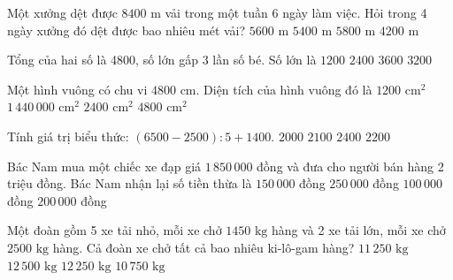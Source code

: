 \begin{ex} %
Một xưởng dệt được $8400\text{ m}$ vải trong một tuần 6 ngày làm việc. Hỏi trong 4 ngày xưởng đó dệt được bao nhiêu mét vải?
\choice
{\True $5600\text{ m}$}
{$5400\text{ m}$}
{$5800\text{ m}$}
{$4200\text{ m}$}
\end{ex}

\begin{ex} %
Tổng của hai số là 4800, số lớn gấp 3 lần số bé. Số lớn là
\choice
{$1200$}
{$2400$}
{\True $3600$}
{$3200$}
\end{ex}

\begin{ex} %
Một hình vuông có chu vi $4800\text{ cm}$. Diện tích của hình vuông đó là
\choice
{$1200\text{ cm}^2$}
{\True $1\,440\,000\text{ cm}^2$}
{$2400\text{ cm}^2$}
{$4800\text{ cm}^2$}
\end{ex}

\begin{ex} %
Tính giá trị biểu thức: $(6500 - 2500) : 5 + 1400$.
\choice
{$2000$}
{$2100$}
{$2400$}
{\True $2200$}
\end{ex}

\begin{ex} %
Bác Nam mua một chiếc xe đạp giá $1\,850\,000$ đồng và đưa cho người bán hàng 2 triệu đồng. Bác Nam nhận lại số tiền thừa là
\choice
{\True $150\,000$ đồng}
{$250\,000$ đồng}
{$100\,000$ đồng}
{$200\,000$ đồng}
\end{ex}

\begin{ex} %
Một đoàn gồm 5 xe tải nhỏ, mỗi xe chở $1450\text{ kg}$ hàng và 2 xe tải lớn, mỗi xe chở $2500\text{ kg}$ hàng. Cả đoàn xe chở tất cả bao nhiêu ki-lô-gam hàng?
\choice
{$11\,250\text{ kg}$}
{$12\,500\text{ kg}$}
{\True $12\,250\text{ kg}$}
{$10\,750\text{ kg}$}
\end{ex}

